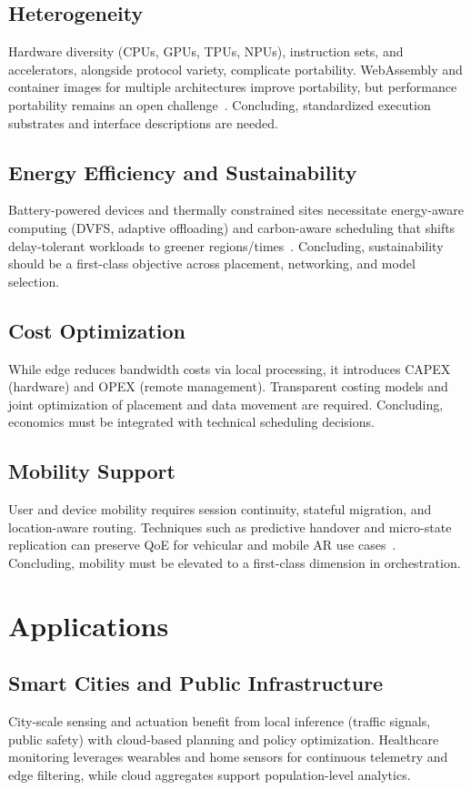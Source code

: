 \documentclass[conference]{IEEEtran}
\begin{document}
\subsection{Heterogeneity}
Hardware diversity (CPUs, GPUs, TPUs, NPUs), instruction sets, and accelerators, alongside protocol variety, complicate portability. WebAssembly and container images for multiple architectures improve portability, but performance portability remains an open challenge~\cite{Haas2017Wasm}. Concluding, standardized execution substrates and interface descriptions are needed.

\subsection{Energy Efficiency and Sustainability}
Battery-powered devices and thermally constrained sites necessitate energy-aware computing (DVFS, adaptive offloading) and carbon-aware scheduling that shifts delay-tolerant workloads to greener regions/times~\cite{Liu2015GLB}. Concluding, sustainability should be a first-class objective across placement, networking, and model selection.

\subsection{Cost Optimization}
While edge reduces bandwidth costs via local processing, it introduces CAPEX (hardware) and OPEX (remote management). Transparent costing models and joint optimization of placement and data movement are required. Concluding, economics must be integrated with technical scheduling decisions.

\subsection{Mobility Support}
User and device mobility requires session continuity, stateful migration, and location-aware routing. Techniques such as predictive handover and micro-state replication can preserve QoE for vehicular and mobile AR use cases~\cite{Abbas2018Survey}. Concluding, mobility must be elevated to a first-class dimension in orchestration.

\section{Applications}\label{sec:applications}
\subsection{Smart Cities and Public Infrastructure}
City-scale sensing and actuation benefit from local inference (traffic signals, public safety) with cloud-based planning and policy optimization. Healthcare monitoring leverages wearables and home sensors for continuous telemetry and edge filtering, while cloud aggregates support population-level analytics.
\end{document}
